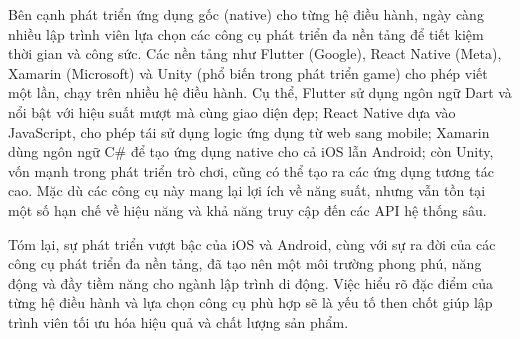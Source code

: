     \begin{flushleft}
      \hspace*{0.8cm}Bên cạnh phát triển ứng dụng gốc (native) cho từng hệ điều hành, ngày càng nhiều lập trình viên lựa chọn các công cụ phát triển đa nền tảng để tiết kiệm thời gian và công sức. Các nền tảng như Flutter (Google), React Native (Meta), Xamarin (Microsoft) và Unity (phổ biến trong phát triển game) cho phép viết một lần, chạy trên nhiều hệ điều hành. Cụ thể, Flutter sử dụng ngôn ngữ Dart và nổi bật với hiệu suất mượt mà cùng giao diện đẹp; React Native dựa vào JavaScript, cho phép tái sử dụng logic ứng dụng từ web sang mobile; Xamarin dùng ngôn ngữ C\# để tạo ứng dụng native cho cả iOS lẫn Android; còn Unity, vốn mạnh trong phát triển trò chơi, cũng có thể tạo ra các ứng dụng tương tác cao. Mặc dù các công cụ này mang lại lợi ích về năng suất, nhưng vẫn tồn tại một số hạn chế về hiệu năng và khả năng truy cập đến các API hệ thống sâu.
    \end{flushleft}

    \begin{flushleft}
      \hspace*{0.8cm}Tóm lại, sự phát triển vượt bậc của iOS và Android, cùng với sự ra đời của các công cụ phát triển đa nền tảng, đã tạo nên một môi trường phong phú, năng động và đầy tiềm năng cho ngành lập trình di động. Việc hiểu rõ đặc điểm của từng hệ điều hành và lựa chọn công cụ phù hợp sẽ là yếu tố then chốt giúp lập trình viên tối ưu hóa hiệu quả và chất lượng sản phẩm.
    \end{flushleft}